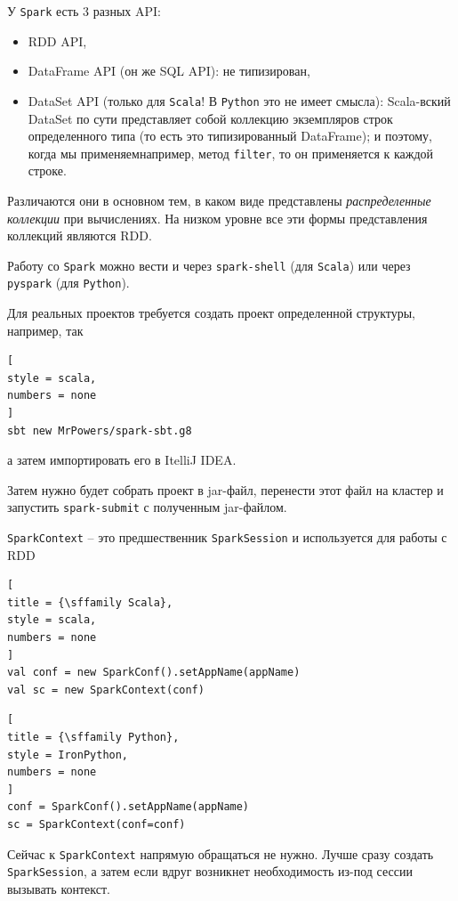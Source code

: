 \documentclass[%
	11pt,
	a4paper,
	utf8,
		]{article}
\begin{document}
У \texttt{Spark} есть 3 разных API:
\begin{itemize}
	\item RDD API,
	
	\item DataFrame API (он же SQL API): не типизирован,
	
	\item DataSet API (только для \texttt{Scala}! В \texttt{Python} это не имеет смысла): Scala-вский DataSet по сути представляет собой коллекцию экземпляров строк определенного типа (то есть это типизированный DataFrame); и поэтому, когда мы применяемнапример, метод \texttt{filter}, то он применяется к каждой строке.
\end{itemize}

Различаются они в основном тем, в каком виде представлены \emph{распределенные коллекции} при вычислениях. На низком уровне все эти формы представления коллекций являются RDD.

Работу со \texttt{Spark} можно вести и через \texttt{spark-shell} (для \texttt{Scala}) или через \texttt{pyspark} (для \texttt{Python}).

Для реальных проектов требуется создать проект определенной структуры, например, так
\begin{lstlisting}[
style = scala,
numbers = none	
]
sbt new MrPowers/spark-sbt.g8
\end{lstlisting}
а затем импортировать его в ItelliJ IDEA.

Затем нужно будет собрать проект в jar-файл, перенести этот файл на кластер и запустить \texttt{spark-submit} с полученным jar-файлом.

\texttt{SparkContext} -- это предшественник \texttt{SparkSession} и используется для работы с RDD
\begin{lstlisting}[
title = {\sffamily Scala},
style = scala,
numbers = none
]
val conf = new SparkConf().setAppName(appName)
val sc = new SparkContext(conf)
\end{lstlisting}

\begin{lstlisting}[
title = {\sffamily Python},
style = IronPython,
numbers = none	
]
conf = SparkConf().setAppName(appName)
sc = SparkContext(conf=conf)
\end{lstlisting}

Сейчас к \texttt{SparkContext} напрямую обращаться не нужно. Лучше сразу создать \texttt{SparkSession}, а затем если вдруг возникнет необходимость из-под сессии вызывать контекст.
\end{document}
